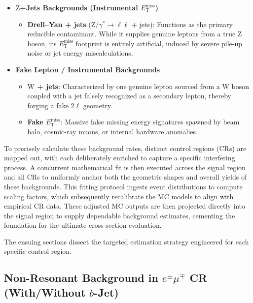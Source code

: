 \begin{itemize}
    \item \textbf{$\text{Z}$+Jets Backgrounds (Instrumental $E_{\text{T}}^{\text{miss}}$)}
    \begin{itemize}
        \item \textbf{Drell--Yan + jets} ($\text{Z}/\gamma^* \to \ell\ell$ + jets): Functions as the primary reducible contaminant. While it supplies genuine leptons from a true $\text{Z}$ boson, its $E_{\text{T}}^{\text{miss}}$ footprint is entirely artificial, induced by severe pile-up noise or jet energy miscalculations.
    \end{itemize}
   
    \item \textbf{Fake Lepton / Instrumental Backgrounds}
    \begin{itemize}
        \item \textbf{$\text{W}$ + jets}: Characterized by one genuine lepton sourced from a $\text{W}$ boson coupled with a jet falsely recognized as a secondary lepton, thereby forging a fake $2\ell$ geometry.
        \item \textbf{Fake $E_{\text{T}}^{\text{miss}}$}: Massive false missing energy signatures spawned by beam halo, cosmic-ray muons, or internal hardware anomalies.
    \end{itemize}
\end{itemize}

To precisely calculate these background rates, distinct control regions (CRs) are mapped out, with each deliberately enriched to capture a specific interfering process. A concurrent mathematical fit is then executed across the signal region and all CRs to uniformly anchor both the geometric shapes and overall yields of these backgrounds. This fitting protocol ingests event distributions to compute scaling factors, which subsequently recalibrate the MC models to align with empirical CR data. These adjusted MC outputs are then projected directly into the signal region to supply dependable background estimates, cementing the foundation for the ultimate cross-section evaluation.

The ensuing sections dissect the targeted estimation strategy engineered for each specific control region.

\subsection{Non-Resonant Background in $e^\pm\mu^\mp$ CR (With/Without $b$-Jet)}
\label{sec:bkg_emuCR}

